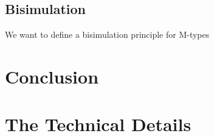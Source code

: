 \documentclass[twoside,11pt,openright]{report}
\begin{document}
\section{Bisimulation}
We want to define a bisimulation principle for M-types


\chapter{Conclusion}
\label{ch:conclusion}



\cleardoublepage
{}
 



\cleardoublepage
\appendix
\chapter{The Technical Details}

\todo[inline]{\dots}
\end{document}
